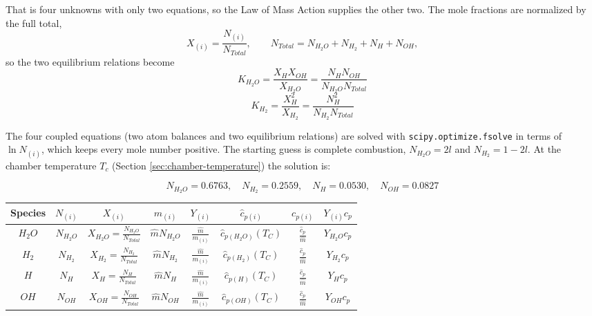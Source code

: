 \documentclass[12pt, Times New Roman]{article}
\begin{document}
    That is four unknowns with only two equations, so the Law of Mass Action supplies the other two.
    The mole fractions are normalized by the full total,
    \begin{equation}
        X_{(i)} = \frac{N_{(i)}}{N_{Total}}, \qquad N_{Total} = N_{H_{2}O} + N_{H_{2}} + N_{H} + N_{OH},
    \end{equation}
    so the two equilibrium relations become
    \begin{equation}
        K_{H_{2}O} = \frac{X_{H} X_{OH}}{X_{H_{2}O}} = \frac{N_{H} N_{OH}}{N_{H_{2}O} N_{Total}}
    \end{equation}
    \begin{equation}
        K_{H_{2}} = \frac{X_{H}^{2}}{X_{H_{2}}} = \frac{N_{H}^{2}}{N_{H_{2}} N_{Total}}
    \end{equation}

    The four coupled equations (two atom balances and two equilibrium relations) are solved with
    \verb|scipy.optimize.fsolve| in terms of $\ln N_{(i)}$, which keeps every mole number positive.
    The starting guess is complete combustion, $N_{H_{2}O} = 2l$ and $N_{H_{2}} = 1 - 2l$.
    At the chamber temperature $T_{c}$ (Section \ref{sec:chamber-temperature}) the solution is:

    \begin{equation}
        N_{H_{2}O} = 0.6763, \quad N_{H_{2}} = 0.2559, \quad N_{H} = 0.0530, \quad N_{OH} = 0.0827
    \end{equation}

    \begin{center}
        \begin{tabular}{|c|c|c|c|c|c|c|c|}
            \hline
            Species & $N_{(i)}$ & $X_{(i)}$ & $m_{(i)}$ &  $Y_{(i)}$ & $\hat{c}_{p(i)}$ & $c_{p(i)}$ & $Y_{(i)}c_{p}$ \\
            \hline
            $H_{2}O$ & $N_{H_{2}O}$ & $X_{H_{2}O} = \frac{N_{H_{2}O}}{N_{Total}}$ & $\hat{m}N_{H_{2}O}$ & $\frac{\hat{m}}{m_{(i)}}$ & $\hat{c}_{p(H_{2}O)}(T_{C})$ & $\frac{\hat{c}_{p}}{\hat{m}}$ & $Y_{H_{2}O}c_{p}$ \\
            \hline
            $H_{2}$ & $N_{H_{2}}$ & $X_{H_{2}} = \frac{N_{H_{2}}}{N_{Total}}$ & $\hat{m}N_{H_{2}}$ & $\frac{\hat{m}}{m_{(i)}}$ & $\hat{c}_{p(H_{2})}(T_{C})$ & $\frac{\hat{c}_{p}}{\hat{m}}$ & $Y_{H_{2}}c_{p}$ \\
            \hline
            $H$ & $N_{H}$ & $X_{H} = \frac{N_{H}}{N_{Total}}$ & $\hat{m}N_{H}$ & $\frac{\hat{m}}{m_{(i)}}$ & $\hat{c}_{p(H)}(T_{C})$ & $\frac{\hat{c}_{p}}{\hat{m}}$ & $Y_{H}c_{p}$ \\
            \hline
            $OH$ & $N_{OH}$ & $X_{OH} = \frac{N_{OH}}{N_{Total}}$ & $\hat{m}N_{OH}$ & $\frac{\hat{m}}{m_{(i)}}$ & $\hat{c}_{p(OH)}(T_{C})$ & $\frac{\hat{c}_{p}}{\hat{m}}$ & $Y_{OH}c_{p}$ \\
            \hline
        \end{tabular}
    \end{center}
\end{document}
